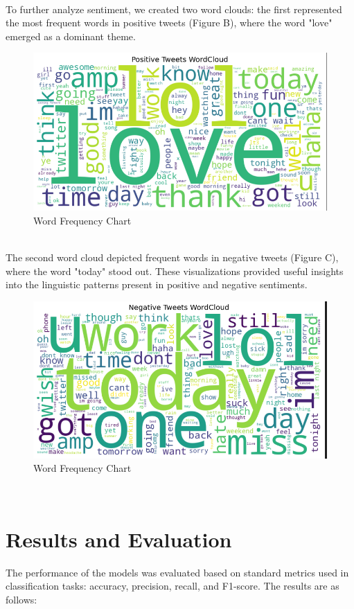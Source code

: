 \documentclass[conference]{IEEEtran}
\begin{document}
\\
To further analyze sentiment, we created two word clouds: the first represented the most frequent words in positive tweets (Figure B),
 where the word "love" emerged as a dominant theme.
 \begin{figure}[H]
        \centering
        \includegraphics[width=\linewidth]{assets/PositiveWorldCloud.png}
        \caption{Word Frequency Chart}
        \label{fig:word_freq_chart}
    \end{figure} 
    \\
    The second word cloud depicted frequent words in negative tweets (Figure C), where the word "today" stood out. 
 These visualizations provided useful insights into the linguistic patterns present in positive and negative sentiments.
 \begin{figure}[H]
        \centering
        \includegraphics[width=\linewidth]{assets/NegativeWordCloud.png}
        \caption{Word Frequency Chart}
        \label{fig:word_freq_chart}
    \end{figure}
 \\
\section{Results and Evaluation}
The performance of the models was evaluated based on standard metrics used in classification tasks: accuracy, precision, recall, and F1-score. 
The results are as follows:
\end{document}
